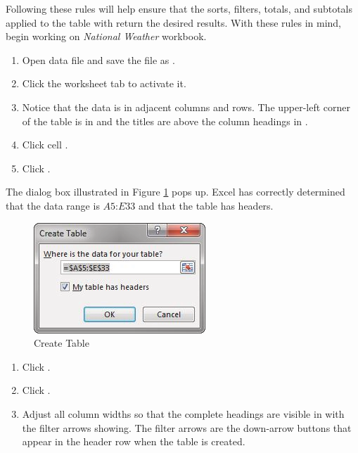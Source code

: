 Following these rules will help ensure that the sorts, filters, totals, and subtotals applied to the table with return the desired results. With these rules in mind, begin working on \textit{National Weather} workbook. 

\begin{enumerate}
	\item Open data file  and save the file as .
	\item Click the  worksheet tab to activate it.
	\item Notice that the data is in adjacent columns and rows. The upper-left corner of the table is in  and the titles are above the column headings in .
	\item Click cell .
	\item Click .
\end{enumerate}

The dialog box illustrated in Figure \ref{05:fig02} pops up. Excel has correctly determined that the data range is $ A5 $:$ E33 $ and that the table has headers.

\begin{figure}[H]
	\centering
	\includegraphics[width=\maxwidth{.95\linewidth}]{gfx/ch05_fig02}
	\caption{Create Table}
	\label{05:fig02}
\end{figure}

\begin{enumerate}[resume]
	\item Click .
	\item Click .
	\item Adjust all column widths so that the complete headings are visible in  with the filter arrows showing. The filter arrows are the down-arrow buttons that appear in the header row when the table is created. 
\end{enumerate}

